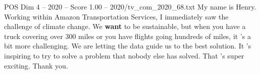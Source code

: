 \begin{textsample}{POS Dim 4 – 2020 – Score 1.00 – 2020/tv\_com\_2020\_68.txt}  \label{ex:f4_pos_041}
My name is Henry.
Working within Amazon Transportation Services, I immediately saw the challenge of climate change.
We \textbf{want} to be sustainable, but when you have a truck covering over 300 miles or you have flights going hundreds of miles, it 's a bit more challenging.
We are letting the data guide us to the best solution.
It 's inspiring to try to solve a problem that nobody else has solved.
That 's super exciting.
Thank you.

\end{textsample}

